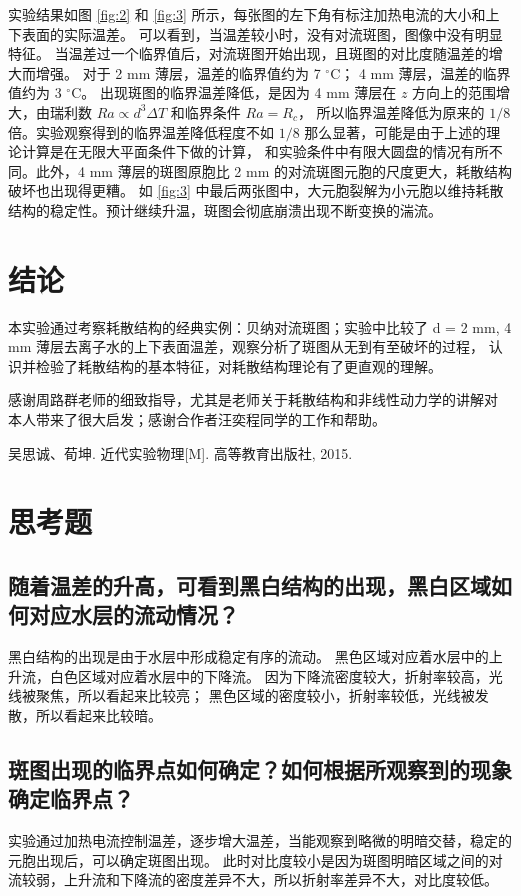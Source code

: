 \documentclass[revtex4-2]{mpltx}
\begin{document}
实验结果如图 \ref{fig:2} 和 \ref{fig:3} 所示，每张图的左下角有标注加热电流的大小和上下表面的实际温差。
可以看到，当温差较小时，没有对流斑图，图像中没有明显特征。
当温差过一个临界值后，对流斑图开始出现，且斑图的对比度随温差的增大而增强。
对于 2 mm 薄层，温差的临界值约为 7 $^\circ$C； 4 mm 薄层，温差的临界值约为 3 $^\circ$C。
出现斑图的临界温差降低，是因为 4 mm 薄层在 $z$ 方向上的范围增大，由瑞利数 $Ra\propto d^3\Delta T$ 和临界条件 $Ra=R_c$，
所以临界温差降低为原来的 $1/8$ 倍。实验观察得到的临界温差降低程度不如 $1/8$ 那么显著，可能是由于上述的理论计算是在无限大平面条件下做的计算，
和实验条件中有限大圆盘的情况有所不同。此外，4 mm 薄层的斑图原胞比 2 mm 的对流斑图元胞的尺度更大，耗散结构破坏也出现得更糟。
如 \ref{fig:3} 中最后两张图中，大元胞裂解为小元胞以维持耗散结构的稳定性。预计继续升温，斑图会彻底崩溃出现不断变换的湍流。
\section{结论}
本实验通过考察耗散结构的经典实例：贝纳对流斑图；实验中比较了 d = 2 mm, 4 mm 薄层去离子水的上下表面温差，观察分析了斑图从无到有至破坏的过程，
认识并检验了耗散结构的基本特征，对耗散结构理论有了更直观的理解。
\begin{acknowledgments}
    感谢周路群老师的细致指导，尤其是老师关于耗散结构和非线性动力学的讲解对
本人带来了很大启发；感谢合作者汪奕程同学的工作和帮助。
\end{acknowledgments}
\begin{thebibliography}{99}
     吴思诚、荀坤. 近代实验物理[M]. 高等教育出版社, 2015.
\end{thebibliography}
\clearpage
\appendix
\section{思考题}
\subsection{随着温差的升高，可看到黑白结构的出现，黑白区域如何对应水层的流动情况？}
黑白结构的出现是由于水层中形成稳定有序的流动。
黑色区域对应着水层中的上升流，白色区域对应着水层中的下降流。
因为下降流密度较大，折射率较高，光线被聚焦，所以看起来比较亮；
黑色区域的密度较小，折射率较低，光线被发散，所以看起来比较暗。

\subsection{斑图出现的临界点如何确定？如何根据所观察到的现象确定临界点？}
实验通过加热电流控制温差，逐步增大温差，当能观察到略微的明暗交替，稳定的元胞出现后，可以确定斑图出现。
此时对比度较小是因为斑图明暗区域之间的对流较弱，上升流和下降流的密度差异不大，所以折射率差异不大，对比度较低。
\end{document}
